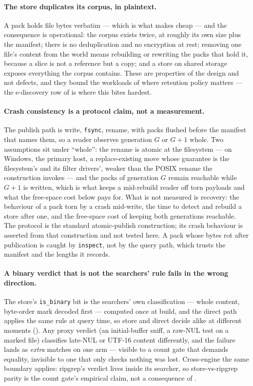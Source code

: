 \documentclass[11pt,letterpaper]{article}
\begin{document}
\paragraph{The store duplicates its corpus, in plaintext.}
A pack holds file bytes verbatim --- which is what makes
 cheap --- and the consequence is operational: the
corpus exists twice, at roughly its own size plus the manifest; there is no
deduplication and no encryption at rest; removing one file's content from
the world means rebuilding or rewriting the packs that hold it, because a
slice is not a reference but a copy; and a store on shared storage exposes
everything the corpus contains. These are properties of the design and not
defects, and they bound the workloads of  where retention
policy matters --- the e-discovery row of  is where this
bites hardest.

\paragraph{Crash consistency is a protocol claim, not a measurement.}
The publish path is write, \texttt{fsync}, rename, with packs flushed
before the manifest that names them, so a reader observes generation $G$ or
$G{+}1$ whole. Two assumptions sit under ``whole'': the rename is atomic at
the filesystem --- on Windows, the primary host, a replace-existing move
whose guarantee is the filesystem's and its filter drivers', weaker than
the POSIX rename the construction invokes --- and the packs of generation
$G$ remain reachable while $G{+}1$ is written, which is what keeps a
mid-rebuild reader off torn payloads and what the free-space cost below
pays for. What is not measured is recovery: the behaviour of a pack
torn by a crash mid-write, the time to detect and rebuild a store after
one, and the free-space cost of keeping both generations reachable. The
protocol is the standard atomic-publish construction; its crash behaviour
is asserted from that construction and not tested here. A pack whose bytes
rot after publication is caught by \texttt{inspect}, not by the query
path, which trusts the manifest and the lengths it records.

\paragraph{A binary verdict that is not the searchers' rule fails in the
wrong direction.}
The store's \texttt{is\_binary} bit is the searchers' own classification ---
whole content, byte-order mark decoded first --- computed once at build, and
the direct path applies the same rule at query time, so store and direct
decide alike at different moments (). Any proxy verdict
(an initial-buffer sniff, a raw-NUL test on a marked file) classifies
late-NUL or UTF-16 content differently, and the failure lands as
\emph{extra} matches on one arm --- visible to a count gate that demands
equality, invisible to one that only checks nothing was lost. Cross-engine
the same boundary applies: ripgrep's verdict lives inside its searcher, so
store-vs-ripgrep parity is the count gate's empirical claim, not a
consequence of .
\end{document}
